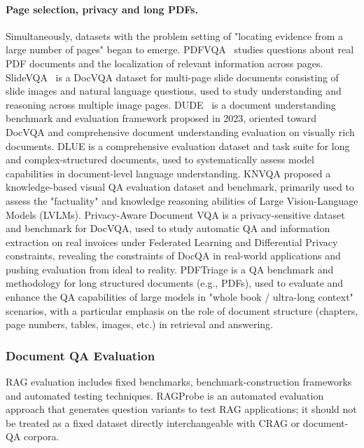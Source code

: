 \paragraph{Page selection, privacy and long PDFs.}
Simultaneously, datasets with the problem setting of "locating evidence from a large number of pages" began to emerge. PDFVQA~\cite{pdfvqa2023} studies questions about real PDF documents and the localization of relevant information across pages. SlideVQA~\cite{slidevqa2023} is a DocVQA dataset for multi-page slide documents consisting of slide images and natural language questions, used to study understanding and reasoning across multiple image pages. DUDE~\cite{dude2023} is a document understanding benchmark and evaluation framework proposed in 2023, oriented toward DocVQA and comprehensive document understanding evaluation on visually rich documents. DLUE \cite{dlue2023} is a comprehensive evaluation dataset and task suite for long and complex-structured documents, used to systematically assess model capabilities in document-level language understanding. KNVQA \cite{knvqa2023} proposed a knowledge-based visual QA evaluation dataset and benchmark, primarily used to assess the "factuality" and knowledge reasoning abilities of Large Vision-Language Models (LVLMs). Privacy-Aware Document VQA \cite{privacydocvqa2023} is a privacy-sensitive dataset and benchmark for DocVQA, used to study automatic QA and information extraction on real invoices under Federated Learning and Differential Privacy constraints, revealing the constraints of DocQA in real-world applications and pushing evaluation from ideal to reality. PDFTriage \cite{saad2024pdftriage} is a QA benchmark and methodology for long structured documents (e.g., PDFs), used to evaluate and enhance the QA capabilities of large models in "whole book / ultra-long context" scenarios, with a particular emphasis on the role of document structure (chapters, page numbers, tables, images, etc.) in retrieval and answering.

\subsubsection{Document QA Evaluation}

RAG evaluation includes fixed benchmarks, benchmark-construction frameworks and automated testing techniques. RAGProbe \cite{ragprobe2023} is an automated evaluation approach that generates question variants to test RAG applications; it should not be treated as a fixed dataset directly interchangeable with CRAG or document-QA corpora.

